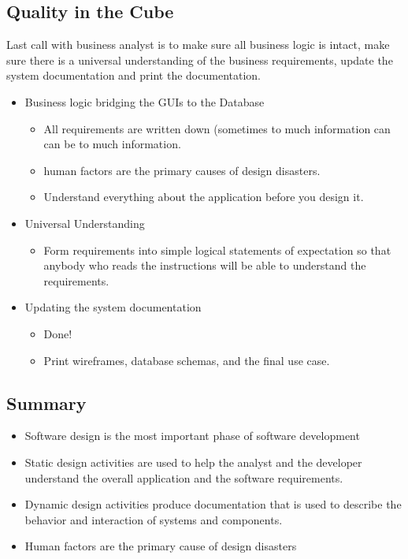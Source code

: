 \documentclass[12pt]{article}
\begin{document}
\subsection{Quality in the Cube}
Last call with business analyst is to make sure all business logic is intact, make sure there is a
universal understanding of the business requirements, update the system documentation and print
the documentation.
\begin{itemize}
	\item Business logic bridging the GUIs to the Database
		\begin{itemize}
			\item All requirements are written down (sometimes to much information can
				can be to much information.
			\item human factors are the primary causes of design disasters.
			\item Understand everything about the application before you design it.
		\end{itemize}
	\item Universal Understanding
		\begin{itemize}
			\item Form requirements into simple logical statements of expectation so that
				anybody who reads the instructions will be able to understand the
				requirements.
		\end{itemize}
	\item Updating the system documentation
		\begin{itemize}
			\item Done!
			\item Print wireframes, database schemas, and the final use case.
		\end{itemize}
\end{itemize}
\subsection{Summary}
\begin{itemize}
	\item Software design is the most important phase of software development
	\item Static design activities are used to help the analyst and the developer understand
		the overall application and the software requirements.
	\item Dynamic design activities produce documentation that is used to describe the behavior
		and interaction of systems and components.
	\item Human factors are the primary cause of design disasters
\end{itemize}
\end{document}
